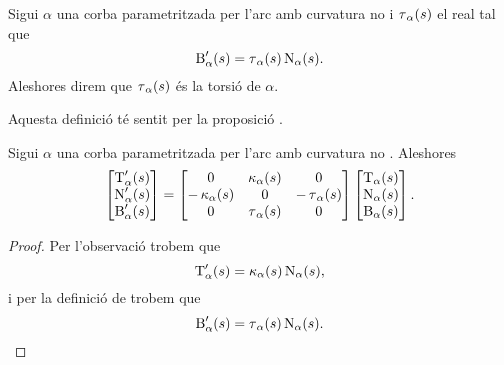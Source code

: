 \documentclass[../../Main.tex]{subfiles}
\begin{document}
	\begin{definition}[Torsió]
		\label{def:torsió}
		Sigui \(\alpha\) una corba parametritzada per l'arc amb curvatura no \nulla{} i \(\operatorname{\tau}_{\alpha}(s)\) el real tal que
		\[
		    \operatorname{B}'_{\alpha}(s)=\operatorname{\tau}_{\alpha}(s)\operatorname{N}_{\alpha}(s).
		\]
		Aleshores direm que \(\operatorname{\tau}_{\alpha}(s)\) és la torsió de \(\alpha\).
		
		Aquesta definició té sentit per la proposició .
	\end{definition}
	\begin{theorem}
		\label{thm:fórmules de Frenet per corbes parametritzades per l'arc}
		Sigui \(\alpha\) una corba parametritzada per l'arc amb curvatura no \nulla{}. Aleshores
		\[\begin{bmatrix}
			\operatorname{T}'_{\alpha}(s) \\
			\operatorname{N}'_{\alpha}(s) \\
			\operatorname{B}'_{\alpha}(s)
		\end{bmatrix}=
		\begin{bmatrix}
			0 & \operatorname{\kappa}_{\alpha}(s) & 0 \\
			-\operatorname{\kappa}_{\alpha}(s) & 0 & -\operatorname{\tau}_{\alpha}(s) \\
			0 & \operatorname{\tau}_{\alpha}(s) & 0
		\end{bmatrix}
		\begin{bmatrix}
			\operatorname{T}_{\alpha}(s) \\
			\operatorname{N}_{\alpha}(s) \\
			\operatorname{B}_{\alpha}(s)
		\end{bmatrix}.\]
		\begin{proof}
			Per l'observació  trobem que
			\begin{equation}
				\label{thm:fórmules de Frenet:eq1}
				\operatorname{T}_{\alpha}'(s)=\operatorname{\kappa}_{\alpha}(s)\operatorname{N}_{\alpha}(s),
			\end{equation}
			i per la definició de  trobem que
			\begin{equation}
				\label{thm:fórmules de Frenet:eq2}
				\operatorname{B}'_{\alpha}(s)=\operatorname{\tau}_{\alpha}(s)\operatorname{N}_{\alpha}(s).
			\end{equation}
			

\end{proof}
\end{theorem}
\end{document}
